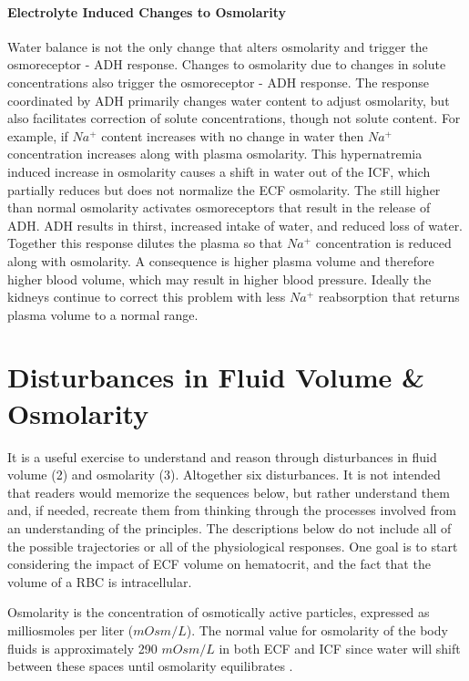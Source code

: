 \paragraph{Electrolyte Induced Changes to Osmolarity}
Water balance is not the only change that alters osmolarity and trigger the osmoreceptor - ADH response. Changes to osmolarity due to changes in solute concentrations also trigger the osmoreceptor - ADH response. The response coordinated by ADH primarily changes water content to adjust osmolarity, but also facilitates correction of solute concentrations, though not solute content. For example, if $Na^+$ content increases with no change in water then $Na^+$ concentration increases along with plasma osmolarity. This hypernatremia induced increase in osmolarity causes a shift in water out of the ICF, which partially reduces but does not normalize the ECF osmolarity. The still higher than normal osmolarity activates osmoreceptors that result in the release of ADH. ADH results in thirst, increased intake of water, and reduced loss of water. Together this response dilutes the plasma so that $Na^+$ concentration is reduced along with osmolarity. A consequence is higher plasma volume and therefore higher blood volume, which may result in higher blood pressure. Ideally the kidneys continue to correct this problem with less $Na^+$ reabsorption that returns plasma volume to a normal range.

\section{Disturbances in Fluid Volume \& Osmolarity}

It is a useful exercise to understand and reason through disturbances in fluid volume (2) and osmolarity (3). Altogether six disturbances. It is not intended that readers would memorize the sequences below, but rather understand them and, if needed, recreate them from thinking through the processes involved from an understanding of the principles. The descriptions below do not include all of the possible trajectories or all of the physiological responses. One goal is to start considering the impact of ECF volume on hematocrit, and the fact that the volume of a RBC is intracellular.

Osmolarity is the concentration of osmotically active particles, expressed as milliosmoles per liter ($mOsm/L$). The normal value for osmolarity of the body fluids is approximately 290 $mOsm/L$ in both ECF and ICF since water will shift between these spaces until osmolarity equilibrates \cite{costanzo_physiology_2013}.

